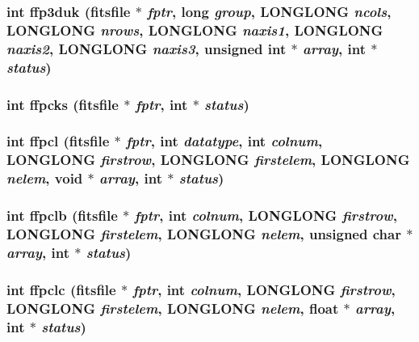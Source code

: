 \subsubsection{\setlength{\rightskip}{0pt plus 5cm}int ffp3duk (\bf{fitsfile} $\ast$ {\em fptr}, long {\em group}, \bf{LONGLONG} {\em ncols}, \bf{LONGLONG} {\em nrows}, \bf{LONGLONG} {\em naxis1}, \bf{LONGLONG} {\em naxis2}, \bf{LONGLONG} {\em naxis3}, unsigned int $\ast$ {\em array}, int $\ast$ {\em status})}\label{src_2fitsio_8h_245d5b7ef5c4c394dbc0c7f3f55a5857}


\subsubsection{\setlength{\rightskip}{0pt plus 5cm}int ffpcks (\bf{fitsfile} $\ast$ {\em fptr}, int $\ast$ {\em status})}\label{src_2fitsio_8h_1063ed09b8a73de4a574e6c4a49c1d72}


\subsubsection{\setlength{\rightskip}{0pt plus 5cm}int ffpcl (\bf{fitsfile} $\ast$ {\em fptr}, int {\em datatype}, int {\em colnum}, \bf{LONGLONG} {\em firstrow}, \bf{LONGLONG} {\em firstelem}, \bf{LONGLONG} {\em nelem}, void $\ast$ {\em array}, int $\ast$ {\em status})}\label{src_2fitsio_8h_28b5f096ba5dc640cd642afdf31c7e01}


\subsubsection{\setlength{\rightskip}{0pt plus 5cm}int ffpclb (\bf{fitsfile} $\ast$ {\em fptr}, int {\em colnum}, \bf{LONGLONG} {\em firstrow}, \bf{LONGLONG} {\em firstelem}, \bf{LONGLONG} {\em nelem}, unsigned char $\ast$ {\em array}, int $\ast$ {\em status})}\label{src_2fitsio_8h_292509f5a619292d087aaa3b8b40a621}


\subsubsection{\setlength{\rightskip}{0pt plus 5cm}int ffpclc (\bf{fitsfile} $\ast$ {\em fptr}, int {\em colnum}, \bf{LONGLONG} {\em firstrow}, \bf{LONGLONG} {\em firstelem}, \bf{LONGLONG} {\em nelem}, float $\ast$ {\em array}, int $\ast$ {\em status})}\label{src_2fitsio_8h_f28b5d35cf1bfba0826c8bac66ecf702}


